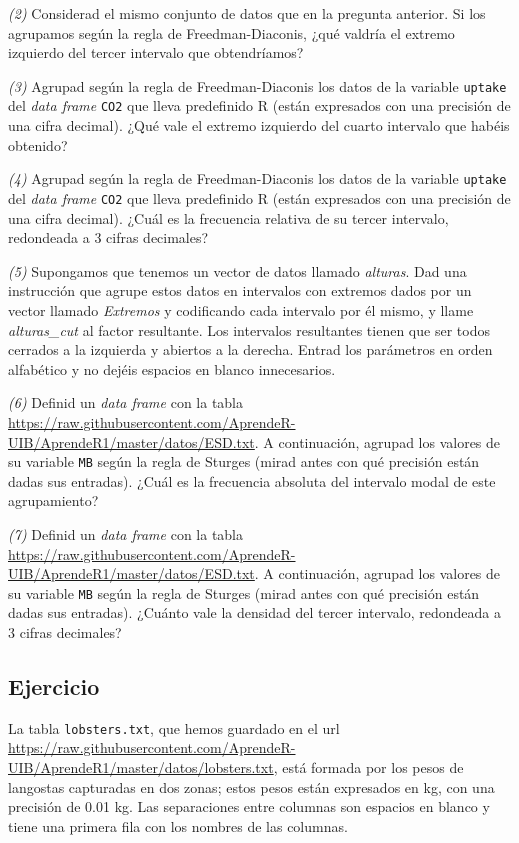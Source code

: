 \documentclass[
]{book}
\theoremstyle{definition}
\theoremstyle{definition}
\theoremstyle{definition}
\theoremstyle{remark}
\begin{document}
\emph{(2)} Considerad el mismo conjunto de datos que en la pregunta anterior. Si los agrupamos según la regla de Freedman-Diaconis, ¿qué valdría el extremo izquierdo del tercer intervalo que obtendríamos?

\emph{(3)} Agrupad según la regla de Freedman-Diaconis los datos de la variable \texttt{uptake} del \emph{data frame} \texttt{CO2} que lleva predefinido R (están expresados con una precisión de una cifra decimal). ¿Qué vale el extremo izquierdo del cuarto intervalo que habéis obtenido?

\emph{(4)} Agrupad según la regla de Freedman-Diaconis los datos de la variable \texttt{uptake} del \emph{data frame} \texttt{CO2} que lleva predefinido R (están expresados con una precisión de una cifra decimal). ¿Cuál es la frecuencia relativa de su tercer intervalo, redondeada a 3 cifras decimales?

\emph{(5)} Supongamos que tenemos un vector de datos llamado \emph{alturas}. Dad una instrucción que agrupe estos datos en intervalos con extremos dados por un vector llamado \emph{Extremos} y codificando cada intervalo por él mismo, y llame \emph{alturas\_cut} al factor resultante. Los intervalos resultantes tienen que ser todos cerrados a la izquierda y abiertos a la derecha. Entrad los parámetros en orden alfabético y no dejéis espacios en blanco innecesarios.

\emph{(6)} Definid un \emph{data frame} con la tabla \url{https://raw.githubusercontent.com/AprendeR-UIB/AprendeR1/master/datos/ESD.txt}. A continuación, agrupad los valores de su variable \texttt{MB} según la regla de Sturges (mirad antes con qué precisión están dadas sus entradas). ¿Cuál es la frecuencia absoluta del intervalo modal de este agrupamiento?

\emph{(7)} Definid un \emph{data frame} con la tabla \url{https://raw.githubusercontent.com/AprendeR-UIB/AprendeR1/master/datos/ESD.txt}. A continuación, agrupad los valores de su variable \texttt{MB} según la regla de Sturges (mirad antes con qué precisión están dadas sus entradas). ¿Cuánto vale la densidad del tercer intervalo, redondeada a 3 cifras decimales?

\hypertarget{ejercicio-10}{%
\subsection*{Ejercicio}\label{ejercicio-10}}

La tabla \texttt{lobsters.txt}, que hemos guardado en el url \url{https://raw.githubusercontent.com/AprendeR-UIB/AprendeR1/master/datos/lobsters.txt}, está formada por los pesos de langostas capturadas en dos zonas; estos pesos están expresados en kg, con una precisión de 0.01 kg. Las separaciones entre columnas son espacios en blanco y tiene una primera fila con los nombres de las columnas.
\end{document}
